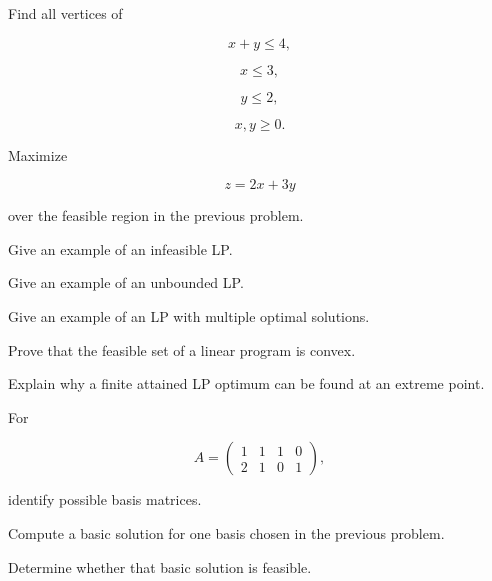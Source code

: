 \begin{exercise}[2]
Find all vertices of

\[
x+y\leq4,
\]

\[
x\leq3,
\]

\[
y\leq2,
\]

\[
x,y\geq0.
\]
\end{exercise}

\begin{exercise}[2]
Maximize

\[
z=2x+3y
\]

over the feasible region in the previous problem.
\end{exercise}

\begin{exercise}[2]
Give an example of an infeasible LP.
\end{exercise}

\begin{exercise}[2]
Give an example of an unbounded LP.
\end{exercise}

\begin{exercise}[2]
Give an example of an LP with multiple optimal solutions.
\end{exercise}

\begin{exercise}[3]
Prove that the feasible set of a linear program is convex.
\end{exercise}

\begin{exercise}[3]
Explain why a finite attained LP optimum can be found at an extreme point.
\end{exercise}

\begin{exercise}[3]
For

\[
A=
\begin{pmatrix}
1&1&1&0\\
2&1&0&1
\end{pmatrix},
\]

identify possible basis matrices.
\end{exercise}

\begin{exercise}[3]
Compute a basic solution for one basis chosen in the previous problem.
\end{exercise}

\begin{exercise}[3]
Determine whether that basic solution is feasible.
\end{exercise}

